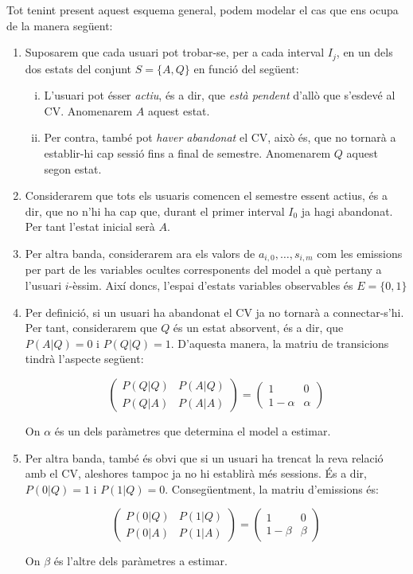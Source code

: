 \documentclass[
	a4paper,
	twoside,
	justified
]{tufte-book}
\begin{document}
Tot tenint present aquest esquema general, podem modelar el cas que ens ocupa de la manera següent:

\begin{enumerate}[(1)]

\item Suposarem que cada usuari pot trobar-se, per a cada interval $I_j$, en un dels dos estats del conjunt $S = \{A,Q\}$ en funció del següent:

	\begin{enumerate}[i.]
	\item L'usuari pot ésser \emph{actiu}, és a dir, que \emph{està pendent} d'allò que s'esdevé al CV. Anomenarem $A$ aquest estat.
	\item Per contra, també pot \emph{haver abandonat} el CV, això és, que no tornarà a establir-hi cap sessió fins a final de semestre. Anomenarem $Q$ aquest segon estat.   
	\end{enumerate}

\item Considerarem que tots els usuaris comencen el semestre essent actius, és a dir, que no n'hi ha cap que, durant el primer interval $I_0$ ja hagi abandonat. Per tant l'estat inicial serà $A$. 
	
\item Per altra banda, considerarem ara els valors de $a_{i,0},\ldots,s_{i,m}$ com les emissions per part de les variables ocultes corresponents del model a què pertany a l'usuari $i$-èssim. Així doncs, l'espai d'estats variables observables és $E = \{0,1\}$

\item Per definició, si un usuari ha abandonat el CV ja no tornarà a connectar-s'hi. Per tant, considerarem que $Q$ és un estat absorvent, és a dir, que $P(A|Q) = 0$ i $P(Q|Q) = 1$. D'aquesta manera, la matriu de transicions tindrà l'aspecte següent:

$$
\begin{pmatrix}
P(Q|Q) & P(A|Q) \\
P(Q|A) & P(A|A)
\end{pmatrix}
=
\begin{pmatrix}
1 & 0 \\
1- \alpha & \alpha
\end{pmatrix}
$$

On $\alpha$ és un dels paràmetres que determina el model a estimar.

\item Per altra banda, també és obvi que si un usuari ha trencat la reva relació amb el CV, aleshores tampoc ja no hi establirà més sessions. És a dir, $P(0|Q) = 1$ i $P(1|Q) = 0$. Consegüentment, la matriu d'emissions és:

$$
\begin{pmatrix}
P(0|Q) & P(1|Q) \\
P(0|A) & P(1|A)
\end{pmatrix}
=
\begin{pmatrix}
1 & 0 \\
1 - \beta & \beta
\end{pmatrix}
$$

On $\beta$ és l'altre dels paràmetres a estimar. 
\end{enumerate} 
\end{document}
